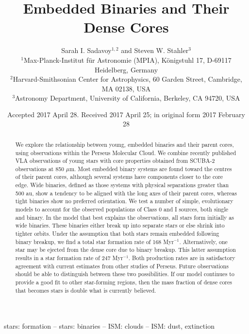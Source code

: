 \documentclass[usenatbib,a4paper]{mnras}
\title[Embedded Binaries and Their Dense Cores]{Embedded Binaries and Their Dense Cores}
\author[Sadavoy \& Stahler]{Sarah I. Sadavoy$^{1,2}$
	 and Steven W. Stahler$^{3}$
	 \\
	 $^{1}$Max-Planck-Institut f\"{u}r Astronomie (MPIA), K\"{o}nigstuhl 17, D-69117 Heidelberg, Germany\\
	 $^{2}$Harvard-Smithsonian Center for Astrophysics, 60 Garden Street, Cambridge, MA 02138, USA\\
	 $^{3}$Astronomy Department, University of California, Berkeley, CA 94720, USA
	 }
\newcommand{\um}{\mbox{$\mu$m}}%
\begin{document}
\date{Accepted 2017 April 28. Received 2017 April 25; in original form 2017 February 28}


\label{firstpage}
\pagerange{\pageref{firstpage}--\pageref{lastpage}}
\maketitle

\begin{abstract}
We explore the relationship between young, embedded binaries and their parent cores, using observations within the Perseus Molecular Cloud.  We combine recently published VLA observations of young stars with core properties obtained from SCUBA-2 observations at 850 \um.   Most embedded binary systems are found toward the centres of their parent cores, although several systems have components closer to the core edge.  Wide binaries, defined as those systems with physical separations greater than 500 au, show a tendency to be aligned with the long axes of their parent cores, whereas tight binaries show no preferred orientation.  We test a number of simple, evolutionary models to account for the observed populations of Class 0 and I sources, both single and binary.  In the model that best explains the observations, all stars form initially as wide binaries.  These binaries either break up into separate stars or else shrink into tighter orbits.  Under the assumption that both stars remain embedded following binary breakup, we find a total star formation rate of 168 Myr$^{-1}$.  Alternatively, one star may be ejected from the dense core due to binary breakup.  This latter assumption results in a star formation rate of 247 Myr$^{-1}$.  Both production rates are in satisfactory agreement with current estimates from other studies of Perseus.  Future observations should be able to distinguish between these two possibilities.  If our model continues to provide a good fit to other star-forming regions, then the mass fraction of dense cores that becomes stars is double what is currently believed.
\end{abstract}

\begin{keywords}
stars: formation -- stars: binaries -- ISM: clouds -- ISM: dust, extinction
\end{keywords}
\end{document}
